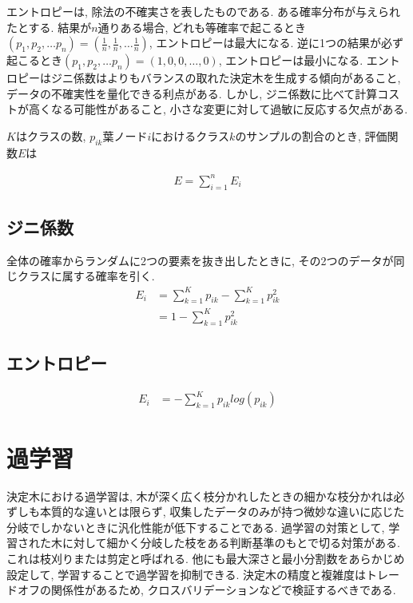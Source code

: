 \documentclass[dvipdfmx, 10pt]{jsarticle}
\begin{document}
エントロピーは, 除法の不確実さを表したものである. ある確率分布が与えられたとする. 
結果が\(n\)通りある場合, どれも等確率で起こるとき\((p_1, p_2, \dots p_n) = (\frac{1}{n}, \frac{1}{n}, \dots \frac{1}{n})\), 
エントロピーは最大になる. 
逆に1つの結果が必ず起こるとき\((p_1, p_2, \dots p_n) = (1, 0, 0, \dots ,0)\), エントロピーは最小になる. 
エントロピーはジニ係数はよりもバランスの取れた決定木を生成する傾向があること, データの不確実性を量化できる利点がある. 
しかし, ジニ係数に比べて計算コストが高くなる可能性があること, 小さな変更に対して過敏に反応する欠点がある. 

\begin{oframed}

\(K\)はクラスの数, \(p_{ik}\)葉ノード\(i\)におけるクラス\(k\)のサンプルの割合のとき, 評価関数\(E\)は

\begin{align*}
    E = \sum_{i=1}^{n} E_i
\end{align*}

\subsection*{ジニ係数}
全体の確率からランダムに2つの要素を抜き出したときに, その2つのデータが同じクラスに属する確率を引く. 
\begin{align*}
    E_i 
    &= \sum_{k=1}^{K} p_{ik} - \sum_{k=1}^{K} p_{ik}^2 \\
    &= 1 - \sum_{k=1}^{K} p_{ik}^2
\end{align*}

\subsection*{エントロピー}
\begin{align*}
    E_i
    &= - \sum_{k=1}^{K} p_{ik} log(p_{ik})
\end{align*}

\end{oframed}

\section*{過学習}
決定木における過学習は, 木が深く広く枝分かれしたときの細かな枝分かれは必ずしも本質的な違いとは限らず, 
収集したデータのみが持つ微妙な違いに応じた分岐でしかないときに汎化性能が低下することである. 
過学習の対策として, 学習された木に対して細かく分岐した枝をある判断基準のもとで切る対策がある. 
これは枝刈りまたは剪定と呼ばれる. 他にも最大深さと最小分割数をあらかじめ設定して, 学習することで過学習を抑制できる. 
決定木の精度と複雑度はトレードオフの関係性があるため, クロスバリデーションなどで検証するべきである. 
\end{document}
